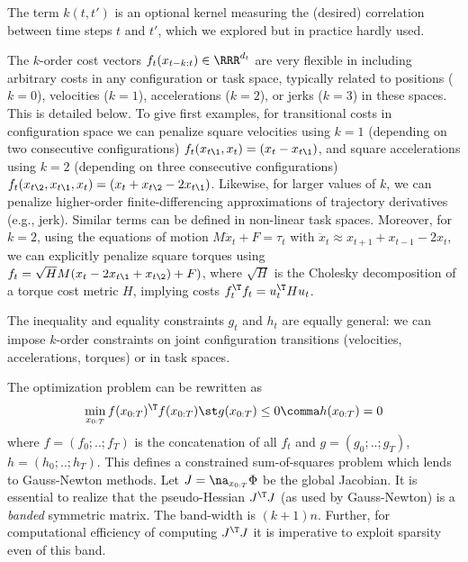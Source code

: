 \documentclass[10pt,fleqn,twoside]{article}
\begin{document}
The term $k(t,t')$ is an optional kernel measuring the (desired)
correlation between time steps $t$ and $t'$, which we explored but in
practice hardly used.

The $k$-order cost vectors $f_t(x_{t-k:t}) \in \RRR^{d_t}$ are very
flexible in including arbitrary costs in any configuration or task space,
typically related to positions ($k=0$), velocities ($k=1$),
accelerations ($k=2$), or jerks ($k=3$) in these spaces. This is
detailed below. To give first examples, for transitional costs in
configuration space we can
penalize square velocities using $k=1$ (depending on two consecutive
configurations) $f_t(x_{t\1}, x_t) = (x_t - x_{t\1})$, and square
accelerations using $k=2$ (depending on three consecutive
configurations) $f_t(x_{t\2}, x_{t\1}, x_t) = (x_{t} + x_{t\2} - 2
x_{t\1})$.  Likewise, for larger values of $k$, we can penalize
higher-order finite-differencing approximations of trajectory
derivatives (e.g., jerk). Similar terms can be defined in non-linear
task spaces.  Moreover, for $k=2$, using the equations of
motion $M\ddot{x}_t + F = \tau_t$ with $\ddot{x}_{t} \approx x_{t+1} +
x_{t-1} - 2 x_{t}$, we can explicitly penalize square torques using
$f_t = \sqrt{H} M (x_t -2 x_{t\1} + x_{t\2}) + F)$, where $\sqrt{H}$
is the Cholesky decomposition of a torque cost metric $H$, implying
costs $f_t^\T f_t = u_t^\T H u_t$.


The inequality and equality constraints $g_t$ and $h_t$ are equally
general: we can impose $k$-order constraints on joint configuration
transitions (velocities, accelerations, torques) or in task spaces.

The optimization problem  can be rewritten as
\begin{align}\label{eqGN}
\min_{x_{0:T}} f(x_{0:T})^\T f(x_{0:T}) \st g(x_{0:T}) \le 0\comma h(x_{0:T})=0
\end{align}
where $f=(f_0;..;f_T)$ is the concatenation of all $f_t$ and
$g=(g_0;..;g_T)$, $h=(h_0;..;h_T)$. This defines a constrained
sum-of-squares problem which lends to Gauss-Newton methods. Let
$J=\na_{x_{0:T}} \Phi$ be the global Jacobian. It is essential to
realize that the pseudo-Hessian $J^\T J$ (as used by Gauss-Newton) is
a \emph{banded} symmetric matrix. The band-width is $(k+1)n$. Further,
for computational efficiency of computing $J^\T J$ it is imperative to
exploit sparsity even of this band.
\end{document}
